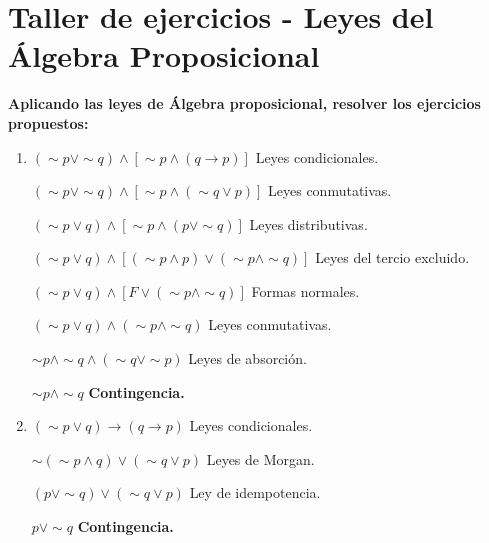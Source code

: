 \documentclass[12pt]{article}
\begin{document}
    
  
    \section*{\centering Taller de ejercicios - Leyes del Álgebra Proposicional}

        \vspace{0.6cm}
        \noindent \textbf{Aplicando las leyes de Álgebra proposicional, resolver los ejercicios propuestos:}

        \vspace{0.6cm}
        \begin{enumerate}[start=5]
            \item {\large $(\sim p \vee \sim q) \wedge [\sim p \wedge (q \longrightarrow p)]$} {\footnotesize Leyes condicionales.}
                \par$(\sim p \vee \sim q) \wedge [\sim p \wedge (\sim q \vee p)]$ {\footnotesize Leyes conmutativas.}
                \par$(\sim p \vee q) \wedge [\sim p \wedge (p \vee \sim q)]$ {\footnotesize Leyes distributivas.}
                \par$(\sim p \vee q) \wedge [(\sim p \wedge p) \vee (\sim p \wedge \sim q)]$ {\footnotesize Leyes del tercio excluido.}
                \par$(\sim p \vee q) \wedge [F \vee (\sim p \wedge \sim q)]$ {\footnotesize Formas normales.} 
                \par$(\sim p \vee q) \wedge (\sim p \wedge \sim q)$ {\footnotesize Leyes conmutativas.} 
                \par$\sim p \wedge \sim q \wedge (\sim q \vee \sim p)$ {\footnotesize Leyes de absorción.}
                \par$\sim p \wedge \sim q$ \textbf{\footnotesize Contingencia.}
                \vspace{0.6cm}

            \item {\large $(\sim p \vee q) \longrightarrow (q \longrightarrow p)$} {\footnotesize Leyes condicionales.}
                \par$\sim (\sim p \wedge q) \vee (\sim q \vee p)$ {\footnotesize Leyes de Morgan.}
                \par$(p \vee \sim q) \vee (\sim q \vee p)$ {\footnotesize Ley de idempotencia.}
                \par$p \vee \sim q$ \textbf{\footnotesize Contingencia.}
                \vspace{0.6cm}
            

\end{enumerate}
\end{document}
